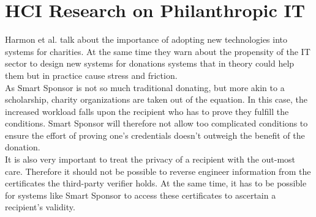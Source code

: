 \section{HCI Research on Philanthropic IT}
Harmon et al.\cite{philit} talk about the importance of adopting new technologies into systems for charities. At the same time they warn about the propensity of the IT sector to design new systems for donations systems that in theory could help them but in practice cause stress and friction.\\
As Smart Sponsor is not so much traditional donating, but more akin to a scholarship, charity organizations are taken out of the equation. In this case, the increased workload falls upon the recipient who has to prove they fulfill the conditions. Smart Sponsor will therefore not allow too complicated conditions to ensure the effort of proving one's credentials doesn't outweigh the benefit of the donation.\\
It is also very important to treat the privacy of a recipient with the out-most care. Therefore it should not be possible to reverse engineer information from the certificates the third-party verifier holds. At the same time, it has to be possible for systems like Smart Sponsor to access these certificates to ascertain a recipient's validity.
